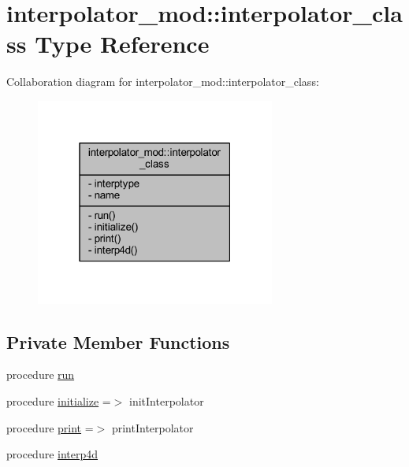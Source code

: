 \hypertarget{structinterpolator__mod_1_1interpolator__class}{}\section{interpolator\+\_\+mod\+:\+:interpolator\+\_\+class Type Reference}
\label{structinterpolator__mod_1_1interpolator__class}


Collaboration diagram for interpolator\+\_\+mod\+:\+:interpolator\+\_\+class\+:
\nopagebreak
\begin{figure}[H]
\begin{center}
\leavevmode
\includegraphics[width=223pt]{structinterpolator__mod_1_1interpolator__class__coll__graph}
\end{center}
\end{figure}
\subsection*{Private Member Functions}
\begin{DoxyCompactItemize}
\item 
procedure \mbox{\hyperlink{structinterpolator__mod_1_1interpolator__class_a1080aca342174069db9c5639853d5dc0}{run}}
\item 
procedure \mbox{\hyperlink{structinterpolator__mod_1_1interpolator__class_a6911f5a4e2cbe3fcd8fbfce906429436}{initialize}} =$>$ init\+Interpolator
\item 
procedure \mbox{\hyperlink{structinterpolator__mod_1_1interpolator__class_a4b3112a37f09901a223d8cc3d81be4dd}{print}} =$>$ print\+Interpolator
\item 
procedure \mbox{\hyperlink{structinterpolator__mod_1_1interpolator__class_a5ee1db117f9411f5969b139499bd61ea}{interp4d}}
\end{DoxyCompactItemize}
